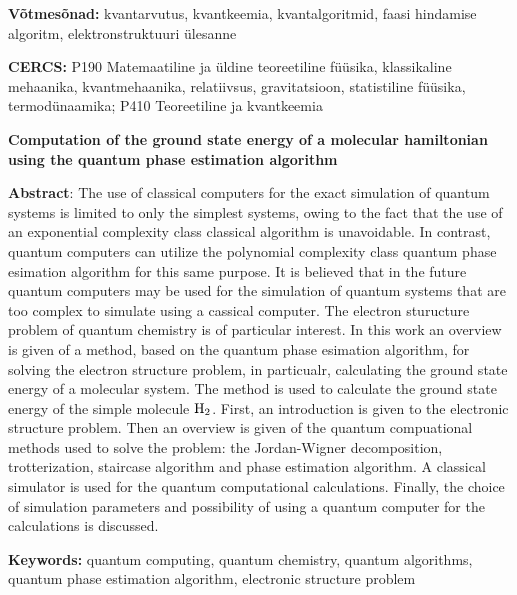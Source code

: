 \documentclass[12pt]{report}
\begin{document}
\vspace*{1ex}

\noindent\textbf{Võtmesõnad:}
kvantarvutus, kvantkeemia, kvantalgoritmid, faasi hindamise algoritm, elektronstruktuuri ülesanne

\vspace*{1ex}

\noindent\textbf{CERCS:}
P190 Matemaatiline ja üldine teoreetiline füüsika, klassikaline mehaanika, kvantmehaanika, relatiivsus, gravitatsioon, statistiline füüsika, termodünaamika;
P410 Teoreetiline ja kvantkeemia

\vspace*{5ex}

\noindent\textbf{\large Computation of the ground state energy of a molecular hamiltonian using the quantum phase estimation algorithm}

\vspace*{1ex}

\noindent\textbf{Abstract}:
The use of classical computers for the exact simulation of quantum systems is limited to only the simplest systems, owing to the fact that the use of an exponential complexity class classical algorithm is unavoidable.
In contrast, quantum computers can utilize the polynomial complexity class quantum phase esimation algorithm for this same purpose.
It is believed that in the future quantum computers may be used for the simulation of quantum systems that are too complex to simulate using a cassical computer.
The electron sturucture problem of quantum chemistry is of particular interest.
In this work an overview is given of a method, based on the quantum phase esimation algorithm, for solving the electron structure problem, in particualr, calculating the ground state energy of a molecular system.
The method is used to calculate the ground state energy of the simple molecule \(\rm H_2\).
First, an introduction is given to the electronic structure problem.
Then an overview is given of the quantum compuational methods used to solve the problem: the Jordan-Wigner decomposition, trotterization, staircase algorithm and phase estimation algorithm.
A classical simulator is used for the quantum computational calculations.
Finally, the choice of simulation parameters and possibility of using a quantum computer for the calculations is discussed.

\noindent\textbf{Keywords:}
quantum computing, quantum chemistry, quantum algorithms, quantum phase estimation algorithm, electronic structure problem

\vspace*{1ex}
\end{document}
